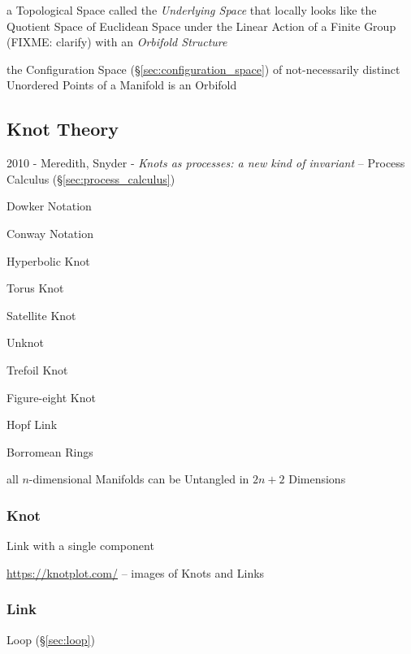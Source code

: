 a Topological Space called the \emph{Underlying Space} that locally looks like
the Quotient Space of Euclidean Space under the Linear Action of a Finite Group
(FIXME: clarify) with an \emph{Orbifold Structure}

the Configuration Space (\S\ref{sec:configuration_space}) of not-necessarily
distinct Unordered Points of a Manifold is an Orbifold



\subsection{Knot Theory} \label{sec:knot_theory}

2010 - Meredith, Snyder - \emph{Knots as processes: a new kind of invariant} --
\fist Process Calculus (\S\ref{sec:process_calculus})

Dowker Notation

Conway Notation



Hyperbolic Knot

Torus Knot

Satellite Knot



Unknot

Trefoil Knot

Figure-eight Knot

Hopf Link

Borromean Rings

\asterism

all $n$-dimensional Manifolds can be Untangled in $2n + 2$ Dimensions



\subsubsection{Knot} \label{sec:knot}

Link with a single component %

\url{https://knotplot.com/} -- images of Knots and Links



\subsubsection{Link} \label{sec:link}

Loop (\S\ref{sec:loop})



